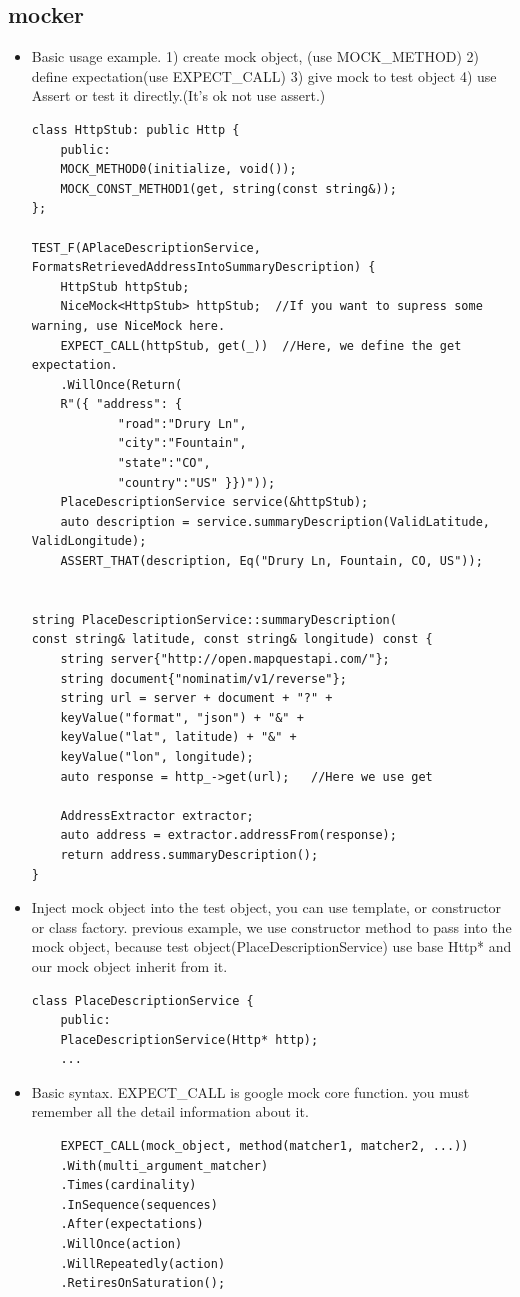 \documentclass[a4paper,11pt,twoside]{book}
\begin{document}
\subsection{mocker}
\begin{itemize}
	\item Basic usage example. 1) create mock object, (use MOCK\_METHOD) 2) define expectation(use EXPECT\_CALL) 3) give mock to test object 4) use Assert or test it directly.(It's ok not use assert.)
	
\begin{lstlisting}
class HttpStub: public Http {  
	public:
	MOCK_METHOD0(initialize, void());
	MOCK_CONST_METHOD1(get, string(const string&));
};

TEST_F(APlaceDescriptionService, FormatsRetrievedAddressIntoSummaryDescription) {
	HttpStub httpStub;
	NiceMock<HttpStub> httpStub;  //If you want to supress some warning, use NiceMock here.
	EXPECT_CALL(httpStub, get(_))  //Here, we define the get expectation.
	.WillOnce(Return(
	R"({ "address": {
			"road":"Drury Ln",
			"city":"Fountain",
			"state":"CO",
			"country":"US" }})"));
	PlaceDescriptionService service(&httpStub);
	auto description = service.summaryDescription(ValidLatitude, ValidLongitude);
	ASSERT_THAT(description, Eq("Drury Ln, Fountain, CO, US"));


string PlaceDescriptionService::summaryDescription(
const string& latitude, const string& longitude) const {
	string server{"http://open.mapquestapi.com/"};
	string document{"nominatim/v1/reverse"};
	string url = server + document + "?" +
	keyValue("format", "json") + "&" +
	keyValue("lat", latitude) + "&" +
	keyValue("lon", longitude);
	auto response = http_->get(url);   //Here we use get
	
	AddressExtractor extractor;
	auto address = extractor.addressFrom(response);
	return address.summaryDescription();
}
\end{lstlisting}

\item Inject mock object into the test object, you can use template, or constructor or class factory.  previous example, we use constructor method to pass into the mock object, because test object(PlaceDescriptionService) use base Http* and our mock object inherit from it. 
\begin{lstlisting}
class PlaceDescriptionService {
	public:
	PlaceDescriptionService(Http* http);
	...
\end{lstlisting}
	
	
	\item Basic syntax. EXPECT\_CALL is google mock core function. you must remember all the detail information about it.
\begin{lstlisting}
	EXPECT_CALL(mock_object, method(matcher1, matcher2, ...))
	.With(multi_argument_matcher)
	.Times(cardinality)
	.InSequence(sequences)
	.After(expectations)
	.WillOnce(action)
	.WillRepeatedly(action)
	.RetiresOnSaturation();
\end{lstlisting}
	

\end{itemize}
\end{document}
